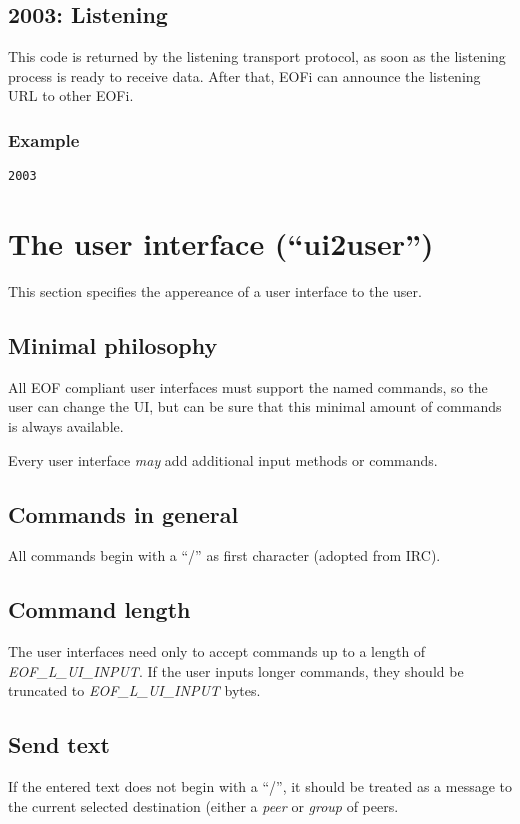 \documentclass[12pt,a4paper]{book}
\begin{document}
\subsection{2003: Listening}
This code is returned by the listening transport protocol, as soon as the
listening process is ready to receive data. After that, EOFi can announce
the listening URL to other EOFi.
\subsubsection{Example}
\begin{verbatim}
2003
\end{verbatim}
\section{The user interface ("`ui2user"')}
This section specifies the appereance of a user interface to the user.
\subsection{Minimal philosophy}
All EOF compliant user interfaces must support the named commands, so the
user can change the UI, but can be sure that this minimal amount of
commands is always available.

Every user interface \emph{may} add additional input methods or commands.
\subsection{Commands in general}
All commands begin with a "`/"' as first character (adopted from IRC).
\subsection{Command length}
The user interfaces need only to accept commands up to a length of
\emph{EOF\_L\_UI\_INPUT}.
If the user inputs longer commands, they should be truncated
to \emph{EOF\_L\_UI\_INPUT} bytes.
\subsection{Send text}
If the entered text does not begin with a "`/"', it should be treated
as a message to the current selected destination (either
a \emph{peer} or \emph{group} of peers.
\end{document}

